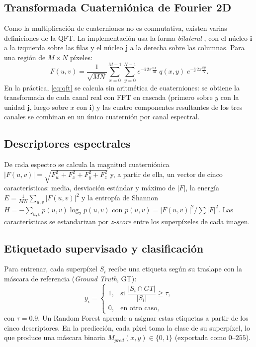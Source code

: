\documentclass[11pt,a4paper]{article}
\begin{document}
\subsection{Transformada Cuaterniónica de Fourier 2D}
Como la multiplicación de cuaterniones no es conmutativa, existen varias
definiciones de la QFT. La implementación usa la forma \emph{bilateral}
\cite{ell2007hypercomplex}, con el núcleo $\mathbf{i}$ a la izquierda sobre las
filas y el núcleo $\mathbf{j}$ a la derecha sobre las columnas. Para una región de
$M\times N$ píxeles:
\begin{equation}
  F(u,v) = \frac{1}{\sqrt{MN}} \sum_{x=0}^{M-1}\sum_{y=0}^{N-1}
  e^{-\mathbf{i}\,2\pi \frac{ux}{M}}\; q(x,y)\; e^{-\mathbf{j}\,2\pi \frac{vy}{N}}.
  \label{eq:qft}
\end{equation}
En la práctica, \cref{eq:qft} se calcula sin aritmética de cuaterniones: se
obtiene la transformada de cada canal real con FFT en cascada (primero sobre $y$
con la unidad $\mathbf{j}$, luego sobre $x$ con $\mathbf{i}$) y las cuatro
componentes resultantes de los tres canales se combinan en un único cuaternión
por canal espectral.

\subsection{Descriptores espectrales}
De cada espectro se calcula la magnitud cuaterniónica
$|F(u,v)| = \sqrt{F_w^2 + F_x^2 + F_y^2 + F_z^2}$ y, a partir de ella, un vector
de cinco características: media, desviación estándar y máximo de $|F|$, la
energía $E = \frac{1}{MN}\sum_{u,v}|F(u,v)|^2$ y la entropía de Shannon
$H = -\sum_{u,v} p(u,v)\log_2 p(u,v)$ con $p(u,v) = |F(u,v)|^2 / \sum|F|^2$.
Las características se estandarizan por \emph{z-score} entre los superpíxeles de
cada imagen.

\subsection{Etiquetado supervisado y clasificación}
Para entrenar, cada superpíxel $S_i$ recibe una etiqueta según su traslape con la
máscara de referencia (\emph{Ground Truth}, GT):
\begin{equation}
  y_i =
  \begin{cases}
    1, & \text{si } \dfrac{|S_i \cap GT|}{|S_i|} \ge \tau, \\[4pt]
    0, & \text{en otro caso,}
  \end{cases}
\end{equation}
con $\tau = 0.9$. Un Random Forest \cite{breiman2001random} aprende a asignar
estas etiquetas a partir de los cinco descriptores. En la predicción, cada píxel
toma la clase de su superpíxel, lo que produce una máscara binaria
$M_{pred}(x,y)\in\{0,1\}$ (exportada como $0$--$255$).
\end{document}
